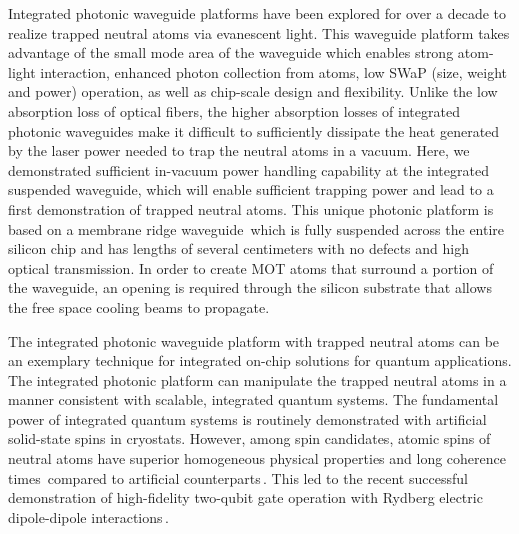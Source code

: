 \documentclass{osa-article}
\begin{document}
Integrated photonic waveguide platforms have been explored for over a decade to realize trapped neutral atoms via evanescent light. This waveguide platform takes advantage of the small mode area of the waveguide which enables strong atom-light interaction, enhanced photon collection from atoms, low SWaP (size, weight and power) operation, as well as chip-scale design and flexibility. Unlike the low absorption loss of optical fibers, the higher absorption losses of integrated photonic waveguides make it difficult to sufficiently dissipate the heat generated by the laser power needed to trap the neutral atoms in a vacuum. Here, we demonstrated sufficient in-vacuum power handling capability at the integrated suspended waveguide, which will enable sufficient trapping power and lead to a first demonstration of trapped neutral atoms. This unique photonic platform is based on a membrane ridge waveguide\,\cite{Ayi-Yovo20} which is fully suspended across the entire silicon chip and has lengths of several centimeters with no defects and high optical transmission. In order to create MOT atoms that surround a portion of the waveguide, an opening is required through the silicon substrate that allows the free space cooling beams to propagate.

The integrated photonic waveguide platform with trapped neutral atoms can be an exemplary technique for integrated on-chip solutions for quantum applications. The integrated photonic platform can manipulate the trapped neutral atoms in a manner consistent with scalable, integrated quantum systems. The fundamental power of integrated quantum systems is routinely demonstrated with artificial solid-state spins in cryostats. However, among spin candidates, atomic spins of neutral atoms have superior homogeneous physical properties and long coherence times\,\cite{Kaufman20} compared to artificial counterparts\,\cite{Englund16,Popkin16}. This led to the recent successful demonstration of high-fidelity two-qubit gate operation with Rydberg electric dipole-dipole interactions\,\cite{Jau16, Lee17, Omran19, Leseleuc19, Grahm19, Endres20}. 
\end{document}
